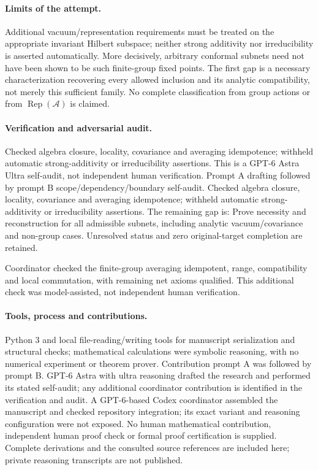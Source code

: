 \documentclass[11pt]{article}
\begin{document}
\paragraph{Limits of the attempt.} Additional vacuum/representation requirements must be treated on the appropriate invariant Hilbert subspace; neither strong additivity nor irreducibility is asserted automatically. More decisively, arbitrary conformal subnets need not have been shown to be such finite-group fixed points. The first gap is a necessary characterization recovering every allowed inclusion and its analytic compatibility, not merely this sufficient family. No complete classification from group actions or from \(\operatorname{Rep}(\mathcal A)\) is claimed.

\paragraph{Verification and adversarial audit.}
Checked algebra closure, locality, covariance and averaging idempotence; withheld automatic strong-additivity or irreducibility assertions. This is a GPT-6 Astra Ultra self-audit, not independent human verification. Prompt A drafting followed by prompt B scope/dependency/boundary self-audit. Checked algebra closure, locality, covariance and averaging idempotence; withheld automatic strong-additivity or irreducibility assertions. The remaining gap is: Prove necessity and reconstruction for all admissible subnets, including analytic vacuum/covariance and non-group cases. Unresolved status and zero original-target completion are retained.

Coordinator checked the finite-group averaging idempotent, range, compatibility and local commutation, with remaining net axioms qualified. This additional check was model-assisted, not independent human verification.

\paragraph{Tools, process and contributions.}
Python 3 and local file-reading/writing tools for manuscript serialization and structural checks; mathematical calculations were symbolic reasoning, with no numerical experiment or theorem prover. Contribution prompt A was followed by prompt B. GPT-6 Astra with ultra reasoning drafted the research and performed its stated self-audit; any additional coordinator contribution is identified in the verification and audit. A GPT-6-based Codex coordinator assembled the manuscript and checked repository integration; its exact variant and reasoning configuration were not exposed. No human mathematical contribution, independent human proof check or formal proof certification is supplied. Complete derivations and the consulted source references are included here; private reasoning transcripts are not published.
\end{document}
